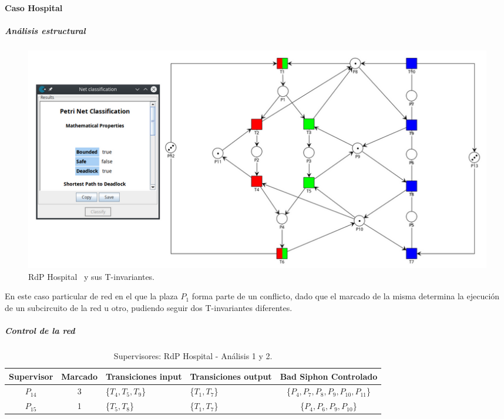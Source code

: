 \paragraph{Caso Hospital}
\subparagraph{Análisis estructural}
\hfill

\begin{figure}[H]
	\centering
	\includegraphics[width=\textwidth]{Figures/algoritmo4/hospital_imag1.png}
	\caption[RdP Hospital y sus T-invariantes.]{RdP Hospital \footnotemark \ y sus T-invariantes.}
	\label{fig:Rdp-Hospitalv4}
\end{figure} 

En este caso particular de red en el que la plaza $P_1$ forma parte de un conflicto, dado que el marcado de la misma determina la ejecución de un subcircuito de la red u otro, pudiendo seguir dos T-invariantes diferentes.

\subparagraph{Control de la red}
\hfill

\begin{table}[H]
    \small
    \centering
    \begin{tabular}{|c|c|P{2.2cm}|P{2.2cm}|c|}
    \hline
    \textbf{Supervisor} & \textbf{Marcado} & \textbf{Transiciones input} & \textbf{Transiciones output} & \textbf{Bad Siphon Controlado}  \\  \hline
    $P_{14}$ & 3 & \{$T_{4}, T_{5}, T_{9}$\} & \{$T_{1}, T_{7}$\} & \{$P_4, P_{7}, P_{8}, P_{9}, P_{10}, P_{11}$\} \\ 
    \hline
    $P_{15}$ & 1 & \{$T_{5}, T_{8}$\} & \{$T_{1}, T_{7}$\} & \{$P_{4},P_{6},P_{9},P_{10}$\} \\ 
    \hline
    \end{tabular}
    \caption{Supervisores: RdP Hospital - Análisis 1 y 2.}
    \label{tab:Huang12-v4}
\end{table}

